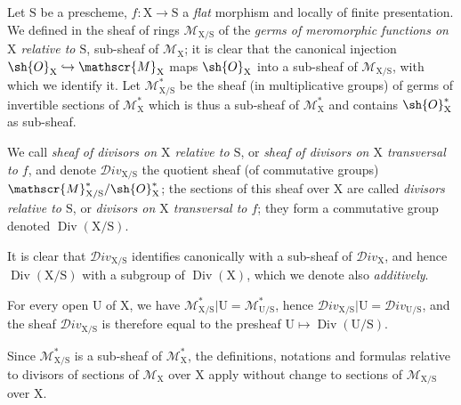 \begin{env}[21.15.1]
\label{IV.21.15.1}
Let $\mathrm{S}$ be a prescheme, $f:\mathrm{X}\to\mathrm{S}$ a \emph{flat} morphism and locally of finite presentation.
We defined in  the sheaf of rings $\mathscr{M}_{\mathrm{X}/\mathrm{S}}$ of the \emph{germs of meromorphic functions on $\mathrm{X}$ relative to $\mathrm{S}$}, sub-sheaf of $\mathscr{M}_{\mathrm{X}}$; it is clear that the canonical injection $\sh{O}_{\mathrm{X}}\hookrightarrow\mathscr{M}_{\mathrm{X}}$  maps $\sh{O}_{\mathrm{X}}$ into a sub-sheaf of $\mathscr{M}_{\mathrm{X}/\mathrm{S}}$, with which we identify it.
Let $\mathscr{M}_{\mathrm{X}/\mathrm{S}}^*$ be the sheaf (in multiplicative groups) of germs of invertible sections of $\mathscr{M}_{\mathrm{X}}^*$ which is thus a sub-sheaf of $\mathscr{M}_{\mathrm{X}}^*$ and contains $\sh{O}_{\mathrm{X}}^*$ as sub-sheaf.
\end{env}

\begin{definition}[21.15.2]
\label{IV.21.15.2}
We call \emph{sheaf of divisors on $\mathrm{X}$ relative to $\mathrm{S}$}, or \emph{sheaf of divisors on $\mathrm{X}$ transversal to $f$}, and denote $\mathscr{D}iv_{\mathrm{X}/\mathrm{S}}$ the quotient sheaf (of commutative groups) $\mathscr{M}_{\mathrm{X}/\mathrm{S}}^*/\sh{O}_{\mathrm{X}}^*$; the sections of this sheaf over $\mathrm{X}$ are called \emph{divisors relative to $\mathrm{S}$}, or \emph{divisors on $\mathrm{X}$ transversal to $f$}; they form a commutative group denoted $\operatorname{Div}(\mathrm{X}/\mathrm{S})$.
\end{definition}

It is clear that $\mathscr{D}iv_{\mathrm{X}/\mathrm{S}}$ identifies canonically with a sub-sheaf of $\mathscr{D}iv_{\mathrm{X}}$, and hence $\operatorname{Div}(\mathrm{X}/\mathrm{S})$ with a subgroup of $\operatorname{Div}(\mathrm{X})$, which we denote also \emph{additively}.

For every open $\mathrm{U}$ of $\mathrm{X}$, we have $\mathscr{M}_{\mathrm{X}/\mathrm{S}}^*|\mathrm{U}=\mathscr{M}_{\mathrm{U}/\mathrm{S}}^*$, hence $\mathscr{D}iv_{\mathrm{X}/\mathrm{S}}|\mathrm{U}=\mathscr{D}iv_{\mathrm{U}/\mathrm{S}}$, and the sheaf $\mathscr{D}iv_{\mathrm{X}/\mathrm{S}}$ is therefore equal to the presheaf $\mathrm{U}\mapsto\operatorname{Div}(\mathrm{U}/\mathrm{S})$.

Since $\mathscr{M}_{\mathrm{X}/\mathrm{S}}^*$ is a sub-sheaf of $\mathscr{M}_{\mathrm{X}}^*$, the definitions, notations and formulas relative to divisors of sections of $\mathscr{M}_{\mathrm{X}}$ over $\mathrm{X}$  apply without change to sections of $\mathscr{M}_{\mathrm{X}/\mathrm{S}}$ over $\mathrm{X}$.

